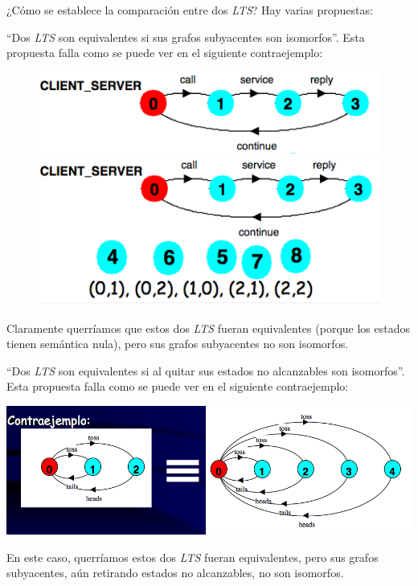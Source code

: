 \documentclass[]{article}
\begin{document}
¿Cómo se establece la comparación entre dos \textit{LTS}? Hay varias propuestas:

``Dos \textit{LTS} son equivalentes si sus grafos subyacentes son isomorfos''. Esta propuesta falla como se puede ver en el siguiente contraejemplo:
\begin{figure}[htb]
 \begin{center}
   \leavevmode
   \includegraphics[scale=0.5]{Isom1.png}
   \includegraphics[scale=0.5]{Isom2.png}
 \end{center}
\end{figure}

Claramente querríamos que estos dos \textit{LTS} fueran equivalentes (porque los estados tienen semántica nula), pero sus grafos subyacentes no son isomorfos.

``Dos \textit{LTS} son equivalentes si al quitar sus estados no alcanzables son isomorfos''. Esta propuesta falla como se puede ver en el siguiente contraejemplo:
\begin{center}
	\includegraphics[scale=0.5]{Isomor.png}
\end{center}

En este caso, querríamos estos dos \textit{LTS} fueran equivalentes, pero sus grafos subyacentes, aún retirando estados no alcanzables, no son isomorfos.
\end{document}
